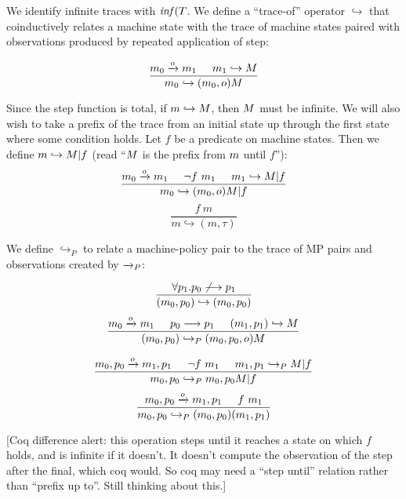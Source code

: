 \documentclass[conference]{IEEEtran}
\begin{document}
    We identify infinite traces with \(\mathit{inf}(T\). We define a ``trace-of'' operator \(\hookrightarrow\)
    that coinductively relates a machine state with the trace of machine states paired with observations
    produced by repeated application of step:

    \[\frac{m_0 \xrightarrow{o} m_1 \hspace{.5cm} m_1 \hookrightarrow M}
           {m_0 \hookrightarrow (m_0,o) M}\]

    Since the step function is total, if \(m \hookrightarrow M\), then \(M\) must be infinite.
    We will also wish to take a prefix of the trace from an initial state up through 
    the first state where some condition holds. Let \(f\) be a predicate on machine states.
    Then we define \(m \hookrightarrow M | f\) (read ``\(M\) is the prefix from
    \(m\) until \(f\)''):
    \[\frac{m_0 \xrightarrow{o} m_1 \hspace{.5cm} \neg f\ m_1 \hspace{.5cm} m_1
              \hookrightarrow M | f}
           {m_0 \hookrightarrow (m_0,o) M | f}\]
    \[\frac{f\ m}
           {m \hookrightarrow (m,\tau)}\]

    We define \(\hookrightarrow_P\) to relate a machine-policy pair to the trace of MP pairs and observations
    created by \(\xrightarrow{}_P\):

    \[\frac{\forall p_1 . p_0 \not \longrightarrow p_1}
           {(m_0,p_0) \hookrightarrow (m_0,p_0)}\]
    \[\frac{m_0 \xrightarrow{o} m_1 \hspace{.5cm} p_0 \longrightarrow p_1 \hspace{.5cm}
              (m_1,p_1) \hookrightarrow M}
           {(m_0,p_0) \hookrightarrow_P (m_0,p_0,o) M}\]
    
    \[\frac{m_0,p_0 \xrightarrow{o} m_1,p_1 \hspace{.5cm} \neg f\ m_1 \hspace{.5cm}
              m_1,p_1 \hookrightarrow_P M | f }
           {m_0,p_0 \hookrightarrow_P m_0,p_0 M | f}\]
    \[\frac{m_0,p_0 \xrightarrow{o} m_1,p_1 \hspace{.5cm} f\ m_1}
           {m_0,p_0 \hookrightarrow_P (m_0,p_0) (m_1,p_1)}\]

    [Coq difference alert: this operation steps until it reaches a state on which \(f\) holds,
    and is infinite if it doesn't. It doesn't compute the observation of the step after the final,
    which coq would. So coq may need a ``step until'' relation rather than ``prefix up to''.
    Still thinking about this.]
\end{document}

